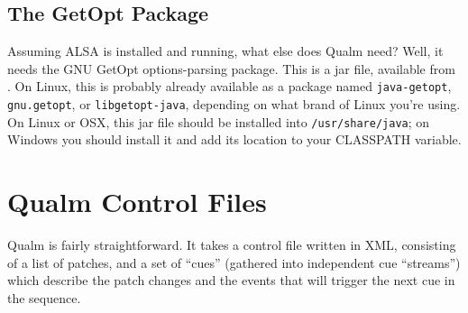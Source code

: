 \documentclass{article}
\newcommand{\q}{{\textsf{Qualm}}\xspace}
\newcommand{\code}[1]{{\tt #1}}
\begin{document}
\subsection{The GetOpt Package}

Assuming ALSA is installed and running, what else does \q need?  Well,
it needs the GNU GetOpt options-parsing package.  This is a jar file,
available from .  On
Linux, this is probably already available as a package named
\code{java-getopt}, \code{gnu.getopt}, or \code{libgetopt-java},
depending on what brand of Linux you're using.  On Linux or OSX, this
jar file should be installed into \code{/usr/share/java}; on Windows
you should install it and add its location to your CLASSPATH variable.

\begin{latexonly}
\newpage
\end{latexonly}
\section{\q Control Files}

\q is fairly straightforward.  It takes a control file written in
XML, consisting of a list of patches, and a set of ``cues'' (gathered into
independent cue ``streams'') which describe the patch changes and the
events that will trigger the next cue in the sequence.
\end{document}
